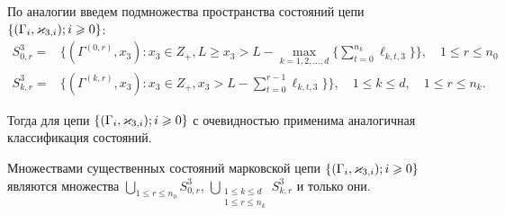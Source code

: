 \documentclass[a4paper,12pt,russian]{extarticle}
\newcommand{\G}{\Gamma}
\newcommand{\MarkThree}{\{(\G_i, \vk_{3,i}); i \geqslant 0\}}
\newcommand{\ga}[1]{\Gamma^{\left( #1 \right)} }
\begin{document}
По аналогии введем подмножества пространства состояний цепи $\MarkThree$:
\begin{equation*}
\begin{aligned}
S^3_{0,r} = & \{(\ga{0,r},x_3) \colon x_3\in Z_+, L \geqslant x_3 > L - \max\limits_{k=1, 2, \ldots, d}\{\sum_{t=0}^{n_k} \ell_{k,t,3}\}\}, \quad 1 \leqslant r \leqslant n_0 \\
S^3_{k,r} = & \{(\ga{k,r},x_3) \colon x_3\in Z_+, x_3 > L - \sum_{t=0}^{r-1} \ell_{k,t,3}\} \}, \quad 1 \leqslant k \leqslant d, \quad 1 \leqslant r \leqslant n_k.
\end{aligned}
\end{equation*}

Тогда для цепи $\MarkThree$ с очевидностью применима аналогичная классификация состояний.
\begin{theorem}
Множествами существенных состояний марковской цепи $\MarkThree$ являются множества $\bigcup\limits_{1 \leqslant r \leqslant n_0}S^3_{0,r}$, $\bigcup\limits_{\substack{1 \leqslant k \leqslant d\\ 1 \leqslant r \leqslant n_k}} S^3_{k,r}$ и только они.
\end{theorem}
\end{document}
